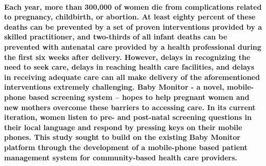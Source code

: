 \abstract


\paragraph{Each year, more than 300,000 of women die from complications related to pregnancy, childbirth, or abortion. At least eighty percent of these deaths can be prevented by a set of proven interventions provided by a skilled practitioner, and two-thirds of all infant deaths can be prevented with antenatal care provided by a health professional during the first six weeks after delivery. However, delays in recognizing the need to seek care, delays in reaching health care facilities, and delays in receiving adequate care can all make delivery of the aforementioned interventions extremely challenging. Baby Monitor -  a novel, mobile-phone based screening system – hopes to help pregnant women and new mothers overcome these barriers to accessing care. In its current iteration, women listen to pre- and post-natal screening questions in their local language and respond by pressing keys on their mobile phones. This study sought to build on the existing Baby Monitor platform through the development of a mobile-phone based patient management system for community-based health care providers.}
